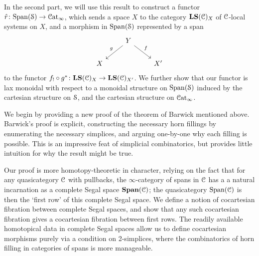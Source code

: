 \documentclass[main.tex]{subfiles}
\begin{document}
In the second part, we will use this result to construct a functor $\hat{r}\colon \Span(\category{S}) \to \ICat$, which sends a space $X$ to the category $\LS(\category{C})_{X}$ of $\category{C}$-local systems on $X$, and a morphism in $\Span(\S)$ represented by a span
\begin{equation*}
  \begin{tikzcd}
    & Y
    \arrow[dl, swap, "g"]
    \arrow[dr, "f"]
    \\
    X
    && X'
  \end{tikzcd}
\end{equation*}
to the functor $f_{!} \circ g^{*}\colon \LS(\category{C})_{X} \to \LS(\category{C})_{X'}$. We further show that our functor is lax monoidal with respect to a monoidal structure on $\Span(\S)$ induced by the cartesian structure on $\S$, and the cartesian structure on $\ICat$.

We begin by providing a new proof of the theorem of Barwick mentioned above. Barwick's proof is explicit, constructing the necessary horn fillings by enumerating the necessary simplices, and arguing one-by-one why each filling is possible. This is an impressive feat of simplicial combinatorics, but provides little intuition for why the result might be true.

Our proof is more homotopy-theoretic in character, relying on the fact that for any quasicategory $\category{C}$ with pullbacks, the $\infty$-category of spans in $\category{C}$ has a a natural incarnation as a complete Segal space $\SPAN(\category{C})$; the quasicategory $\Span(\category{C})$ is then the `first row' of this complete Segal space. We define a notion of cocartesian fibration between complete Segal spaces, and show that any such cocartesian fibration gives a cocartesian fibration between first rows. The readily available homotopical data in complete Segal spaces allow us to define cocartesian morphisms purely via a condition on 2-simplices, where the combinatorics of horn filling in categories of spans is more manageable.
\end{document}

